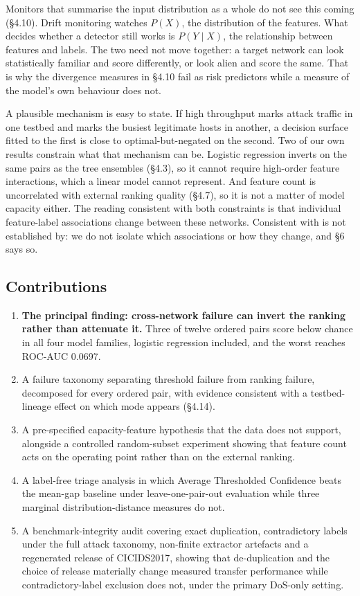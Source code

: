 \documentclass[11pt,a4paper]{article}
\begin{document}
Monitors that summarise the input distribution as a whole do not see this coming (§4.10). Drift monitoring watches $P(X)$, the distribution of the features. What decides whether a detector still works is $P(Y \mid X)$, the relationship between features and labels. The two need not move together: a target network can look statistically familiar and score differently, or look alien and score the same. That is why the divergence measures in §4.10 fail as risk predictors while a measure of the model's own behaviour does not.

A plausible mechanism is easy to state. If high throughput marks attack traffic in one testbed and marks the busiest legitimate hosts in another, a decision surface fitted to the first is close to optimal-but-negated on the second. Two of our own results constrain what that mechanism can be. Logistic regression inverts on the same pairs as the tree ensembles (§4.3), so it cannot require high-order feature interactions, which a linear model cannot represent. And feature count is uncorrelated with external ranking quality (§4.7), so it is not a matter of model capacity either. The reading consistent with both constraints is that individual feature-label associations change between these networks. Consistent with is not established by: we do not isolate which associations or how they change, and §6 says so.

\subsection{Contributions}

\begin{enumerate}[leftmargin=*,itemsep=2pt]
\item \textbf{The principal finding: cross-network failure can invert the ranking rather than attenuate it.} Three of twelve ordered pairs score below chance in all four model families, logistic regression included, and the worst reaches ROC-AUC 0.0697.
\item A failure taxonomy separating threshold failure from ranking failure, decomposed for every ordered pair, with evidence consistent with a testbed-lineage effect on which mode appears (§4.14).
\item A pre-specified capacity-feature hypothesis that the data does not support, alongside a controlled random-subset experiment showing that feature count acts on the operating point rather than on the external ranking.
\item A label-free triage analysis in which Average Thresholded Confidence beats the mean-gap baseline under leave-one-pair-out evaluation while three marginal distribution-distance measures do not.
\item A benchmark-integrity audit covering exact duplication, contradictory labels under the full attack taxonomy, non-finite extractor artefacts and a regenerated release of CICIDS2017, showing that de-duplication and the choice of release materially change measured transfer performance while contradictory-label exclusion does not, under the primary DoS-only setting.
\end{enumerate}
\end{document}
